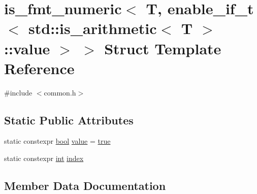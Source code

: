 \hypertarget{structis__fmt__numeric_3_01_t_00_01enable__if__t_3_01std_1_1is__arithmetic_3_01_t_01_4_1_1value_01_4_01_4}{}\section{is\+\_\+fmt\+\_\+numeric$<$ T, enable\+\_\+if\+\_\+t$<$ std\+::is\+\_\+arithmetic$<$ T $>$\+::value $>$ $>$ Struct Template Reference}
\label{structis__fmt__numeric_3_01_t_00_01enable__if__t_3_01std_1_1is__arithmetic_3_01_t_01_4_1_1value_01_4_01_4}


{\ttfamily \#include $<$common.\+h$>$}

\subsection*{Static Public Attributes}
\begin{DoxyCompactItemize}
\item 
static constexpr \mbox{\hyperlink{asdl_8h_af6a258d8f3ee5206d682d799316314b1}{bool}} \mbox{\hyperlink{structis__fmt__numeric_3_01_t_00_01enable__if__t_3_01std_1_1is__arithmetic_3_01_t_01_4_1_1value_01_4_01_4_af2f8e78558e1a3cc6c77196456c00a77}{value}} = \mbox{\hyperlink{asdl_8h_af6a258d8f3ee5206d682d799316314b1a08f175a5505a10b9ed657defeb050e4b}{true}}
\item 
static constexpr \mbox{\hyperlink{warnings_8h_a74f207b5aa4ba51c3a2ad59b219a423b}{int}} \mbox{\hyperlink{structis__fmt__numeric_3_01_t_00_01enable__if__t_3_01std_1_1is__arithmetic_3_01_t_01_4_1_1value_01_4_01_4_aaabd4d87f843cbbdf2a352417dc127ca}{index}}
\end{DoxyCompactItemize}


\subsection{Member Data Documentation}
\mbox{\label{structis__fmt__numeric_3_01_t_00_01enable__if__t_3_01std_1_1is__arithmetic_3_01_t_01_4_1_1value_01_4_01_4_aaabd4d87f843cbbdf2a352417dc127ca}} 
